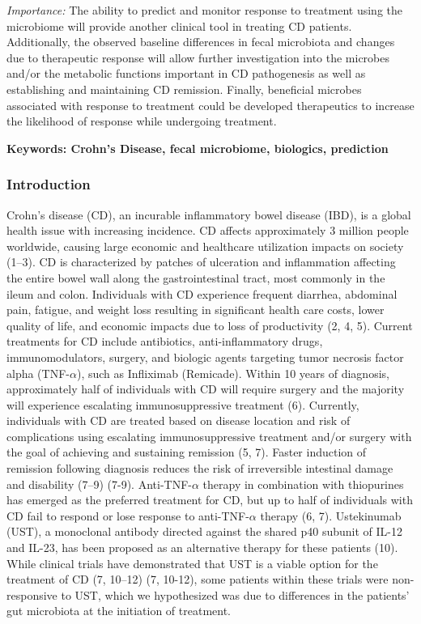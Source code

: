 \documentclass[11pt,]{article}
\begin{document}
\emph{Importance:} The ability to predict and monitor response to
treatment using the microbiome will provide another clinical tool in
treating CD patients. Additionally, the observed baseline differences in
fecal microbiota and changes due to therapeutic response will allow
further investigation into the microbes and/or the metabolic functions
important in CD pathogenesis as well as establishing and maintaining CD
remission. Finally, beneficial microbes associated with response to
treatment could be developed therapeutics to increase the likelihood of
response while undergoing treatment.

\textbf{Keywords: Crohn's Disease, fecal microbiome, biologics,
prediction}

\newpage

\subsubsection{Introduction}\label{introduction}

Crohn's disease (CD), an incurable inflammatory bowel disease (IBD), is
a global health issue with increasing incidence. CD affects
approximately 3 million people worldwide, causing large economic and
healthcare utilization impacts on society (1--3). CD is characterized by
patches of ulceration and inflammation affecting the entire bowel wall
along the gastrointestinal tract, most commonly in the ileum and colon.
Individuals with CD experience frequent diarrhea, abdominal pain,
fatigue, and weight loss resulting in significant health care costs,
lower quality of life, and economic impacts due to loss of productivity
(2, 4, 5). Current treatments for CD include antibiotics,
anti-inflammatory drugs, immunomodulators, surgery, and biologic agents
targeting tumor necrosis factor alpha (TNF-\({\alpha}\)), such as
Infliximab (Remicade). Within 10 years of diagnosis, approximately half
of individuals with CD will require surgery and the majority will
experience escalating immunosuppressive treatment (6). Currently,
individuals with CD are treated based on disease location and risk of
complications using escalating immunosuppressive treatment and/or
surgery with the goal of achieving and sustaining remission (5, 7).
Faster induction of remission following diagnosis reduces the risk of
irreversible intestinal damage and disability (7--9) (7-9).
Anti-TNF-\({\alpha}\) therapy in combination with thiopurines has
emerged as the preferred treatment for CD, but up to half of individuals
with CD fail to respond or lose response to anti-TNF-\({\alpha}\)
therapy (6, 7). Ustekinumab (UST), a monoclonal antibody directed
against the shared p40 subunit of IL-12 and IL-23, has been proposed as
an alternative therapy for these patients (10). While clinical trials
have demonstrated that UST is a viable option for the treatment of CD
(7, 10--12) (7, 10-12), some patients within these trials were
non-responsive to UST, which we hypothesized was due to differences in
the patients' gut microbiota at the initiation of treatment.
\end{document}
